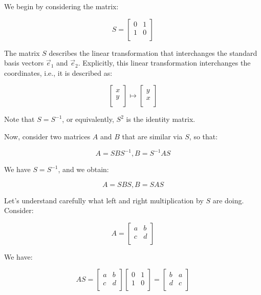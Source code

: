 \documentclass[10pt]{amsart}
\begin{document}
We begin by considering the matrix:

$$S = \left[ \begin{matrix} 0 & 1 \\ 1 & 0 \\\end{matrix}\right]$$

The matrix $S$ describes the linear transformation that interchanges
the standard basis vectors $\vec{e}_1$ and $\vec{e}_2$. Explicitly,
this linear transformation interchanges the coordinates, i.e., it is
described as:

$$\left[\begin{matrix} x \\ y \\\end{matrix}\right] \mapsto \left[\begin{matrix} y \\ x \\\end{matrix}\right]$$

Note that $S = S^{-1}$, or equivalently, $S^2$ is the identity matrix.

Now, consider two matrices $A$ and $B$ that are similar via $S$, so that:

$$A = SBS^{-1}, B = S^{-1}AS$$

We have $S = S^{-1}$, and we obtain:

$$A = SBS, B = SAS$$

Let's understand carefully what left and right multiplication by $S$
are doing. Consider:

$$A = \left[\begin{matrix} a & b \\ c & d \\\end{matrix}\right]$$

We have:

$$AS = \left[\begin{matrix} a & b \\ c & d \\\end{matrix}\right] \left[\begin{matrix} 0 & 1 \\ 1 & 0 \\\end{matrix}\right] = \left[\begin{matrix} b & a \\ d & c \\\end{matrix}\right]$$
\end{document}
